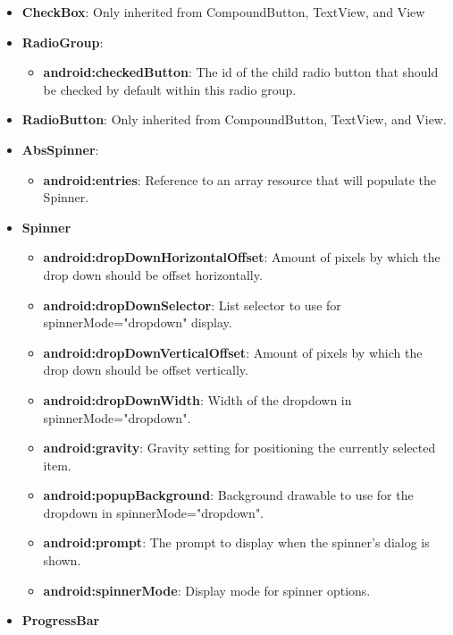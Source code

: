 \documentclass{report}
\begin{document}
\begin{itemize}
\begin{itemize}
            \end{itemize}
        \item \textbf{CheckBox}: Only inherited from CompoundButton, TextView, and View
        \item \textbf{RadioGroup}:
            \begin{itemize}
                \item \textbf{android:checkedButton}:	The id of the child radio button that should be checked by default within this radio group. 
            \end{itemize}
        \item \textbf{RadioButton}: Only inherited from CompoundButton, TextView, and View.
        \item \textbf{AbsSpinner}:
            \begin{itemize}
                \item \textbf{android:entries}:	Reference to an array resource that will populate the Spinner. 
            \end{itemize}
        \item \textbf{Spinner}
            \begin{itemize}
                \item \textbf{android:dropDownHorizontalOffset}:	Amount of pixels by which the drop down should be offset horizontally. 
                \item \textbf{android:dropDownSelector}:	List selector to use for spinnerMode="dropdown" display. 
                \item \textbf{android:dropDownVerticalOffset}:	Amount of pixels by which the drop down should be offset vertically. 
                \item \textbf{android:dropDownWidth}:	Width of the dropdown in spinnerMode="dropdown". 
                \item \textbf{android:gravity}:	Gravity setting for positioning the currently selected item. 
                \item \textbf{android:popupBackground}:	Background drawable to use for the dropdown in spinnerMode="dropdown". 
                \item \textbf{android:prompt}:	The prompt to display when the spinner's dialog is shown. 
                \item \textbf{android:spinnerMode}:	Display mode for spinner options. 
            \end{itemize}
        \item \textbf{ProgressBar}

\end{itemize}
\end{document}
